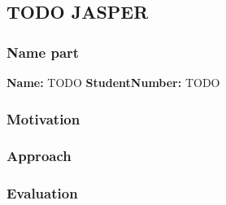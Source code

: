 \subsection{TODO JASPER}
\subsubsection*{Name part}
\textbf{Name:} TODO \indent \textbf{StudentNumber:} TODO

\subsubsection*{Motivation}

\subsubsection*{Approach}

\subsubsection*{Evaluation }